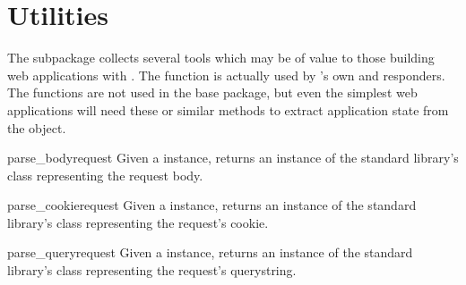 \section{Utilities \label{utils}}

The  subpackage collects several tools which may be of value
to those building web applications with . The 
function is actually used by 's own  and
 responders. The  functions are not used in
the base package, but even the simplest web applications will need these or
similar methods to extract application state from the  object.


\begin{funcdesc}{parse_body}{request}
Given a  instance, returns an instance of the standard library's
 class
representing the request body.
\end{funcdesc}

\begin{funcdesc}{parse_cookie}{request}
Given a  instance, returns an instance of the standard library's
 class
representing the request's cookie.
\end{funcdesc}

\begin{funcdesc}{parse_query}{request}
Given a  instance, returns an instance of the standard library's
 class
representing the request's querystring.
\end{funcdesc}



